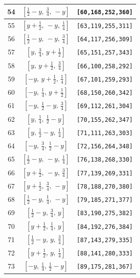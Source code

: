 \documentclass[fleqn,8pt]{jsarticle}
\begin{document}
\begin{longtable}{ccc}
54 & $\left[ \frac{1}{2} - y,\, \frac{3}{4},\, - y \right]$ & {\tt [60,168,252,360]} \\ \hline
55 & $\left[ y + \frac{1}{2},\, - y,\, \frac{1}{4} \right]$ & {\tt [63,119,255,311]} \\ \hline
56 & $\left[ \frac{1}{2} - y,\, - y,\, \frac{3}{4} \right]$ & {\tt [64,117,256,309]} \\ \hline
57 & $\left[ y,\, \frac{3}{4},\, y + \frac{1}{2} \right]$ & {\tt [65,151,257,343]} \\ \hline
58 & $\left[ y,\, y + \frac{1}{2},\, \frac{3}{4} \right]$ & {\tt [66,100,258,292]} \\ \hline
59 & $\left[ - y,\, y + \frac{1}{2},\, \frac{1}{4} \right]$ & {\tt [67,101,259,293]} \\ \hline
60 & $\left[ - y,\, \frac{1}{4},\, y + \frac{1}{2} \right]$ & {\tt [68,150,260,342]} \\ \hline
61 & $\left[ - y,\, \frac{1}{2} - y,\, \frac{3}{4} \right]$ & {\tt [69,112,261,304]} \\ \hline
62 & $\left[ y,\, \frac{1}{4},\, \frac{1}{2} - y \right]$ & {\tt [70,155,262,347]} \\ \hline
63 & $\left[ y,\, \frac{1}{2} - y,\, \frac{1}{4} \right]$ & {\tt [71,111,263,303]} \\ \hline
64 & $\left[ - y,\, \frac{3}{4},\, \frac{1}{2} - y \right]$ & {\tt [72,156,264,348]} \\ \hline
65 & $\left[ \frac{1}{2} - y,\, - y,\, \frac{1}{4} \right]$ & {\tt [76,138,268,330]} \\ \hline
66 & $\left[ y + \frac{1}{2},\, - y,\, \frac{3}{4} \right]$ & {\tt [77,139,269,331]} \\ \hline
67 & $\left[ y + \frac{1}{2},\, \frac{3}{4},\, - y \right]$ & {\tt [78,188,270,380]} \\ \hline
68 & $\left[ \frac{1}{2} - y,\, \frac{1}{4},\, - y \right]$ & {\tt [79,185,271,377]} \\ \hline
69 & $\left[ \frac{1}{2} - y,\, \frac{3}{4},\, y \right]$ & {\tt [83,190,275,382]} \\ \hline
70 & $\left[ y + \frac{1}{2},\, \frac{1}{4},\, y \right]$ & {\tt [84,192,276,384]} \\ \hline
71 & $\left[ \frac{1}{2} - y,\, y,\, \frac{3}{4} \right]$ & {\tt [87,143,279,335]} \\ \hline
72 & $\left[ y + \frac{1}{2},\, y,\, \frac{1}{4} \right]$ & {\tt [88,141,280,333]} \\ \hline
73 & $\left[ - y,\, \frac{1}{4},\, \frac{1}{2} - y \right]$ & {\tt [89,175,281,367]} \\ \hline

\end{longtable}
\end{document}
